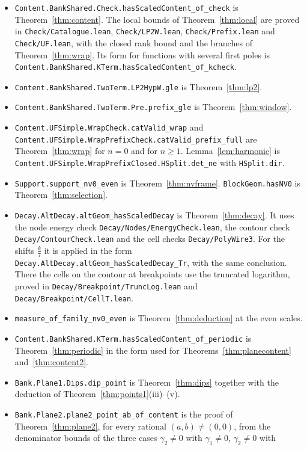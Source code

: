 \documentclass[11pt]{amsart}
\theoremstyle{definition}
\theoremstyle{remark}
\numberwithin{equation}{section}
\newcommand{\lean}[1]{\nolinkurl{#1}}
\begin{document}
\begin{itemize}
\item \lean{Content.BankShared.Check.hasScaledContent_of_check} is Theorem~\ref{thm:content}. The local bounds of
 Theorem~\ref{thm:local} are proved in \lean{Check/Catalogue.lean}, \lean{Check/LP2W.lean},
 \lean{Check/Prefix.lean} and \lean{Check/UF.lean}, with the closed rank bound and the branches of
 Theorem~\ref{thm:wrap}. Its form for functions with several first poles is
 \lean{Content.BankShared.KTerm.hasScaledContent_of_kcheck}.
\item \lean{Content.BankShared.TwoTerm.LP2HypW.gle} is Theorem~\ref{thm:lp2}.
\item \lean{Content.BankShared.TwoTerm.Pre.prefix_gle} is Theorem~\ref{thm:window}.
\item \lean{Content.UFSimple.WrapCheck.catValid_wrap} and \lean{Content.UFSimple.WrapPrefixCheck.catValid_prefix_full}
 are Theorem~\ref{thm:wrap} for $n=0$ and for $n\ge1$. Lemma~\ref{lem:harmonic} is
 \lean{Content.UFSimple.WrapPrefixClosed.HSplit.det_ne} with \lean{HSplit.dir}.
\item \lean{Support.support_nv0_even} is Theorem~\ref{thm:nvframe}. \lean{BlockGeom.hasNV0} is
 Theorem~\ref{thm:selection}.
\item \lean{Decay.AltDecay.altGeom_hasScaledDecay} is Theorem~\ref{thm:decay}. It uses the node energy check
 \lean{Decay/Nodes/EnergyCheck.lean}, the contour check \lean{Decay/ContourCheck.lean} and the cell checks
 \lean{Decay/PolyWire3}. For the shifts $\frac k7$ it is applied in the form
 \lean{Decay.AltDecay.altGeom_hasScaledDecay_Tr}, with the same conclusion. There the cells on the contour at breakpoints use the
 truncated logarithm, proved in \lean{Decay/Breakpoint/TruncLog.lean} and \lean{Decay/Breakpoint/CellT.lean}.
\item \lean{measure_of_family_nv0_even} is Theorem~\ref{thm:deduction} at the even scales.
\item \lean{Content.BankShared.KTerm.hasScaledContent_of_periodic} is Theorem~\ref{thm:periodic} in the form used
 for Theorems~\ref{thm:planecontent} and~\ref{thm:content2}.
\item \lean{Bank.Plane1.Dips.dip_point} is Theorem~\ref{thm:dips} together with the deduction of
 Theorem~\ref{thm:points1}(iii)--(v).
\item \lean{Bank.Plane2.plane2_point_ab_of_content} is the proof of Theorem~\ref{thm:plane2}, for every rational
 $(a,b)\ne(0,0)$, from the denominator bounds of the three cases $\gamma_2\ne0$ with $\gamma_1\ne0$, $\gamma_2\ne0$ with

\end{itemize}
\end{document}
